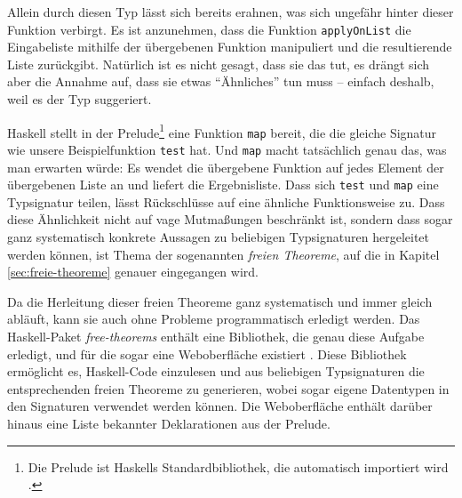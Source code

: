 Allein durch diesen Typ lässt sich bereits erahnen, was sich ungefähr hinter dieser Funktion verbirgt.
Es ist anzunehmen, dass die  Funktion \texttt{applyOnList} die Eingabeliste mithilfe der übergebenen Funktion manipuliert und die
resultierende Liste zurückgibt. Natürlich ist es nicht gesagt, dass sie das tut, es drängt sich aber die Annahme auf, dass sie
etwas ``Ähnliches'' tun muss -- einfach deshalb, weil es der Typ suggeriert.

Haskell stellt in der Prelude\footnote{Die Prelude ist Haskells Standardbibliothek, die automatisch importiert wird \cite{haskell}.}
eine Funktion \texttt{map} bereit, die die gleiche Signatur wie unsere Beispielfunktion \texttt{test} hat. Und \texttt{map} macht tatsächlich genau das, was
man erwarten würde: Es wendet die übergebene Funktion auf jedes Element der übergebenen Liste an und liefert die Ergebnisliste.
Dass sich \texttt{test} und
\texttt{map} eine Typsignatur teilen, lässt Rückschlüsse auf eine ähnliche Funktionsweise zu. Dass diese Ähnlichkeit
nicht auf vage Mutmaßungen beschränkt ist, sondern dass sogar ganz systematisch konkrete Aussagen zu beliebigen Typsignaturen
hergeleitet werden können, ist Thema der sogenannten \textit{freien Theoreme}, auf die in Kapitel \ref{sec:freie-theoreme}
genauer eingegangen wird.

Da die Herleitung dieser freien Theoreme ganz systematisch und immer gleich abläuft, kann sie auch ohne Probleme
programmatisch erledigt werden. Das Haskell-Paket \textit{free-theorems} \cite{freetheorems} enthält eine Bibliothek, die
genau diese Aufgabe erledigt, und für die sogar eine Weboberfläche existiert \cite{freetheoremswebui}.
Diese Bibliothek ermöglicht es, Haskell-Code einzulesen und aus beliebigen Typsignaturen die entsprechenden freien
Theoreme zu generieren, wobei sogar eigene Datentypen in den Signaturen verwendet werden können.
Die Web\-ober\-flä\-che enthält darüber hinaus  eine Liste bekannter Deklarationen aus der Prelude.

